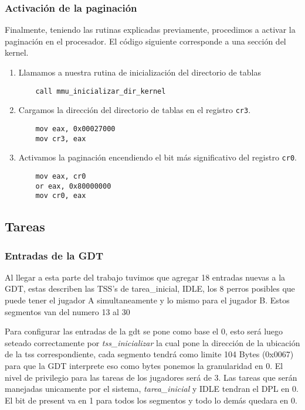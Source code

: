 \subsubsection{Activación de la paginación}

Finalmente, teniendo las rutinas explicadas previamente, procedimos a activar la
paginación en el procesador. El código siguiente corresponde a una sección del
kernel.

\begin{enumerate}
	\item Llamamos a nuestra rutina de inicialización del directorio de tablas
	\begin{lstlisting}
	call mmu_inicializar_dir_kernel
	\end{lstlisting}

	\item Cargamos la dirección del directorio de tablas en el registro
		\texttt{cr3}.
	\begin{lstlisting}
	mov eax, 0x00027000
	mov cr3, eax
	\end{lstlisting}

	\item Activamos la paginación encendiendo el bit más significativo del
		registro \texttt{cr0}.
	\begin{lstlisting}
	mov eax, cr0
	or eax, 0x80000000
	mov cr0, eax
	\end{lstlisting}
\end{enumerate}

\subsection{Tareas}

\subsubsection{Entradas de la GDT}

Al llegar a esta parte del trabajo tuvimos que agregar 18 entradas nuevas a la GDT, estas describen las TSS's de tarea\_inicial, IDLE, los 8 perros posibles que puede tener el jugador A simultaneamente y lo mismo para el jugador B. Estos segmentos van del numero 13 al 30

Para configurar las entradas de la gdt se pone como base el 0, esto será luego seteado correctamente por \textit{tss\_inicializar} la cual pone la dirección de la ubicación de la tss correspondiente, cada segmento tendrá como limite 104 Bytes (0x0067) para que la GDT interprete eso como bytes ponemos la granularidad en 0. El nivel de privilegio para las tareas de los jugadores será de 3. Las tareas que serán manejadas unicamente por el sistema, \textit{tarea\_inicial} y IDLE tendran el DPL en 0. El bit de present va en 1 para todos los segmentos y todo lo demás quedara en 0.

